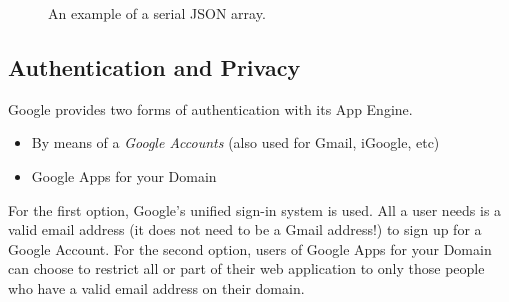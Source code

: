 \begin{figure}[ht] %
\begin{center}
\begin{code}
["/home/bboterm/app-engine/",{"key1":"value1","key2":"value2","key3":"value3"},
  "R0lGODlh(...)KSAAOw=="]
\end{code}
\caption{An example of a serial JSON array.\label{serverdesign-json-string}}
\end{center}
\end{figure}

% 
% 
% 
 
\subsection{Authentication and Privacy}
\label{serverdesign-auth}
Google provides two forms of authentication with its App Engine.

\begin{itemize}
\item By means of a \emph{Google Accounts} (also used for Gmail, iGoogle, etc)
\item Google Apps for your Domain
\end{itemize}

For the first option, Google's unified sign-in system is used. All a user needs
is a valid email address (it does not need to be a Gmail address!) to sign up
for a Google Account. For the second option, users of Google Apps for your Domain can
choose to restrict all or part of their web application to only those people who
have a valid email address on their domain.

